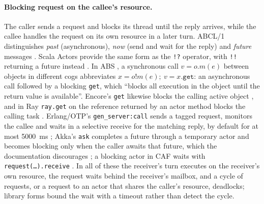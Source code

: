 \documentclass[11pt]{article}
\theoremstyle{definition}
\theoremstyle{remark}
\begin{document}
\paragraph{Blocking request on the callee's resource.} The caller sends a request and
blocks its thread until the reply arrives, while the callee handles the request on its
own resource in a later turn. ABCL/1 distinguishes \emph{past} (asynchronous), \emph{now}
(send and wait for the reply) and \emph{future} messages \cite{yonezawa1986}. Scala Actors
provide the same form as the \texttt{!?} operator, with \texttt{!!} returning a future
instead \cite{haller2009scala}. In ABS \cite{johnsen2012abs}, a synchronous call
$v = o.m(e)$ between objects in different cogs abbreviates
$x = o!m(e);\ v = x.\mathtt{get}$: an asynchronous call followed by a blocking
\texttt{get}, which ``blocks all execution in the object until the return value is
available''. Encore's \texttt{get} likewise blocks the calling active object
\cite{brandauer2015encore}, and in Ray \texttt{ray.get} on the reference returned by an
actor method blocks the calling task \cite{moritz2018ray}. Erlang/OTP's
\texttt{gen\_server:call} sends a tagged request, monitors the callee and waits in a
selective receive for the matching reply, by default for at most 5000~ms
\cite{armstrong2003,otpgenserver}; Akka's \texttt{ask} completes a future through a
temporary actor and becomes blocking only when the caller awaits that future, which the
documentation discourages \cite{akkaask}; a blocking actor in CAF waits with
\texttt{request(\ldots).receive} \cite{charousset2016caf}. In all of these the
receiver's turn executes on the receiver's own resource, the request waits behind the
receiver's mailbox, and a cycle of requests, or a request to an actor that shares the
caller's resource, deadlocks; library forms bound the wait with a timeout rather than
detect the cycle.
\end{document}
